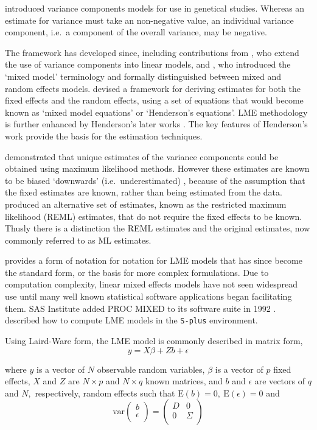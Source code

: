 \documentclass[12pt, a4paper]{report}
\theoremstyle{plain}
\theoremstyle{definition}
\theoremstyle{remark}
\begin{document}
\citet{Fisher4} introduced variance components models for use in genetical studies. Whereas an estimate for variance must take an non-negative value, an individual variance component, i.e.\ a component of the overall variance, may be negative.


The framework has developed since, including contributions from
\citet{tippett}, who extend the use of variance components into linear models, and \citet{eisenhart}, who introduced the `mixed model' terminology and formally distinguished between mixed and random effects models. \citet{Henderson:1950} devised a framework for deriving estimates for both the fixed effects and the random effects, using a set of equations that would become known as `mixed model equations' or `Henderson's equations'.
LME methodology is further enhanced by Henderson's later works \citep{Henderson53, Henderson59,Henderson63,Henderson73,Henderson84a}. The key features of Henderson's work provide the basis for the estimation techniques.

\citet{HartleyRao} demonstrated that unique estimates of the variance components could be obtained using maximum likelihood methods. However these estimates are known to be biased `downwards' (i.e.\ underestimated) , because of the assumption that the fixed estimates are known, rather than being estimated from the data. \citet{PattersonThompson} produced an alternative set of estimates, known as the restricted maximum likelihood (REML) estimates, that do not require the fixed effects to be known. Thusly there is a distinction the REML estimates and the original estimates, now commonly referred to as ML estimates.

\citet{LW82} provides a form of notation for notation for LME models that has since become the standard form, or the basis for more complex formulations. Due to computation complexity, linear mixed effects models have not seen widespread use until many well known statistical software applications began facilitating them. SAS Institute added PROC MIXED to its software suite in 1992 \citep{singer}. \citet{PB} described how to compute LME models in the \texttt{S-plus} environment.

Using Laird-Ware form, the LME model is commonly described in matrix form,
\begin{equation}
y = X\beta + Zb + \epsilon
\label{LW}
\end{equation}

\noindent where $y$ is a vector of $N$ observable random variables, $\beta$ is a vector of $p$ fixed effects, $X$ and $Z$ are $N \times p$ and $N \times q$ known matrices, and $b$ and $\epsilon$  are vectors of $q$ and $N,$ respectively, random effects such that $\mathrm{E}(b)=0, \ \mathrm{E}(\epsilon)=0$
and
\[
\mathrm{var}
\left(
\begin{array}{c}
b \\
\epsilon \\
\end{array}
\right)
=
\left(
\begin{array}{cc}
D & 0 \\
0 & \Sigma \\
\end{array}
\right)
\]
\end{document}
